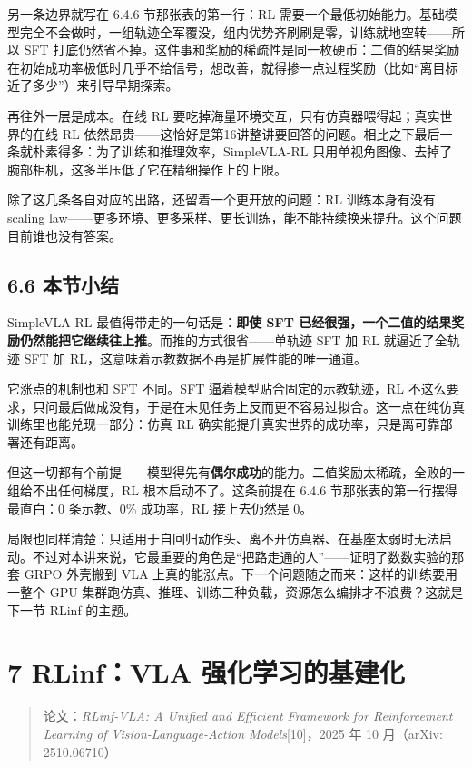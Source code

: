 \documentclass[
  chinese,
]{ctexart}
\begin{document}
另一条边界就写在 6.4.6 节那张表的第一行：RL
需要一个最低初始能力。基础模型完全不会做时，一组轨迹全军覆没，组内优势齐刷刷是零，训练就地空转------所以
SFT
打底仍然省不掉。这件事和奖励的稀疏性是同一枚硬币：二值的结果奖励在初始成功率极低时几乎不给信号，想改善，就得掺一点过程奖励（比如``离目标近了多少''）来引导早期探索。

再往外一层是成本。在线 RL
要吃掉海量环境交互，只有仿真器喂得起；真实世界的在线 RL
依然昂贵------这恰好是第16讲整讲要回答的问题。相比之下最后一条就朴素得多：为了训练和推理效率，SimpleVLA-RL
只用单视角图像、去掉了腕部相机，这多半压低了它在精细操作上的上限。

除了这几条各自对应的出路，还留着一个更开放的问题：RL 训练本身有没有
scaling
law------更多环境、更多采样、更长训练，能不能持续换来提升。这个问题目前谁也没有答案。

\subsection{6.6 本节小结}\label{ux672cux8282ux5c0fux7ed3-5}

SimpleVLA-RL 最值得带走的一句话是：\textbf{即使 SFT
已经很强，一个二值的结果奖励仍然能把它继续往上推}。而推的方式很省------单轨迹
SFT 加 RL 就逼近了全轨迹 SFT 加
RL，这意味着示教数据不再是扩展性能的唯一通道。

它涨点的机制也和 SFT 不同。SFT 逼着模型贴合固定的示教轨迹，RL
不这么要求，只问最后做成没有，于是在未见任务上反而更不容易过拟合。这一点在纯仿真训练里也能兑现一部分：仿真
RL 确实能提升真实世界的成功率，只是离可靠部署还有距离。

但这一切都有个前提------模型得先有\textbf{偶尔成功}的能力。二值奖励太稀疏，全败的一组给不出任何梯度，RL
根本启动不了。这条前提在 6.4.6 节那张表的第一行摆得最直白：0 条示教、0\%
成功率，RL 接上去仍然是 0。

局限也同样清楚：只适用于自回归动作头、离不开仿真器、在基座太弱时无法启动。不过对本讲来说，它最重要的角色是``把路走通的人''------证明了数数实验的那套
GRPO 外壳搬到 VLA 上真的能涨点。下一个问题随之而来：这样的训练要用一整个
GPU 集群跑仿真、推理、训练三种负载，资源怎么编排才不浪费？这就是下一节
RLinf 的主题。

\section{7 RLinf：VLA
强化学习的基建化}\label{rlinfvla-ux5f3aux5316ux5b66ux4e60ux7684ux57faux5efaux5316}

\begin{quote}
论文：\emph{RLinf-VLA: A Unified and Efficient Framework for
Reinforcement Learning of Vision-Language-Action Models}{[}10{]}，2025
年 10 月（arXiv: 2510.06710）
\end{quote}
\end{document}
